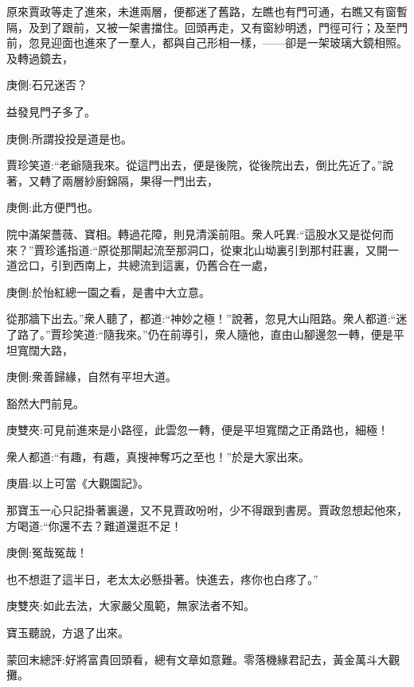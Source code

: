 \begin{parag}
    原來賈政等走了進來，未進兩層，便都迷了舊路，左瞧也有門可通，右瞧又有窗暫隔，及到了跟前，又被一架書擋住。回頭再走，又有窗紗明透，門徑可行；及至門前，忽見迎面也進來了一羣人，都與自己形相一樣，——卻是一架玻璃大鏡相照。及轉過鏡去，\begin{note}庚側:石兄迷否？\end{note}益發見門子多了。\begin{note}庚側:所謂投投是道是也。\end{note}賈珍笑道:“老爺隨我來。從這門出去，便是後院，從後院出去，倒比先近了。”說著，又轉了兩層紗廚錦隔，果得一門出去，\begin{note}庚側:此方便門也。\end{note}院中滿架薔薇、寶相。轉過花障，則見清溪前阻。衆人吒異:“這股水又是從何而來？”賈珍遙指道:“原從那閘起流至那洞口，從東北山坳裏引到那村莊裏，又開一道岔口，引到西南上，共總流到這裏，仍舊合在一處，\begin{note}庚側:於怡紅總一園之看，是書中大立意。\end{note}從那牆下出去。”衆人聽了，都道:“神妙之極！”說著，忽見大山阻路。衆人都道:“迷了路了。”賈珍笑道:“隨我來。”仍在前導引，衆人隨他，直由山腳邊忽一轉，便是平坦寬闊大路，\begin{note}庚側:衆善歸緣，自然有平坦大道。\end{note}豁然大門前見。\begin{note}庚雙夾:可見前進來是小路徑，此雲忽一轉，便是平坦寬闊之正甬路也，細極！\end{note}衆人都道:“有趣，有趣，真搜神奪巧之至也！”於是大家出來。\begin{note}庚眉:以上可當《大觀園記》。\end{note}那寶玉一心只記掛著裏邊，又不見賈政吩咐，少不得跟到書房。賈政忽想起他來，方喝道:“你還不去？難道還逛不足！\begin{note}庚側:冤哉冤哉！\end{note}也不想逛了這半日，老太太必懸掛著。快進去，疼你也白疼了。”\begin{note}庚雙夾:如此去法，大家嚴父風範，無家法者不知。\end{note}寶玉聽說，方退了出來。
\end{parag}


\begin{parag}
    \begin{note}蒙回末總評:好將富貴回頭看，總有文章如意難。零落機緣君記去，黃金萬斗大觀攤。\end{note}
\end{parag}

